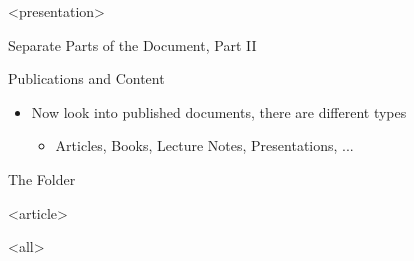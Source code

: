 \mode
<presentation>

\begin{frame}{Separate Parts of the Document, Part II}
  \label{separate:parts:pc1}

  Publications and Content

  \begin{itemize}
    \item Now look into published documents, there are different types
      \begin{itemize}
        \item Articles, Books, Lecture Notes, Presentations, ...
      \end{itemize}
  \end{itemize}

  \begin{block}{The Folder }
  \end{block}

\end{frame}




\mode
<article>

\bigskip


\clearpage

\mode
<all>
